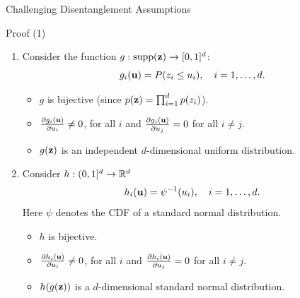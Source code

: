 \begin{frame}{Challenging Disentanglement Assumptions}
\begin{block}{Proof (1)}
	\begin{enumerate}
		\item 
		Consider the function $g: \text{supp}(\mathbf{z}) \rightarrow [0, 1]^d$:
		\vspace{-0.1cm}
		\[
		g_i(\mathbf{u}) = P(z_i \leq u_i), \quad i=1, \dots, d.
		\]
		\vspace{-0.4cm}
		\begin{itemize}
			\item $g$ is bijective (since $p(\mathbf{z}) = \prod_{i=1}^dp(z_i)$).
			\item $\frac{\partial g_i(\mathbf{u})}{\partial u_i} \neq 0$, for all $i$ and $\frac{\partial g_i(\mathbf{u})}{\partial u_j} = 0$ for all $i \neq j$.
			\item $g(\mathbf{z})$ is an independent $d$-dimensional uniform distribution.
		\end{itemize}
		\item 
		Consider $h: (0, 1]^d \rightarrow \mathbb{R}^d$
		\[
		h_i(\mathbf{u}) = \psi^{-1}(u_i), \quad i= 1, \dots, d.
		\]
		Here $\psi$  denotes the CDF of a standard normal distribution.
		\begin{itemize}
			\item $h$ is bijective.
			\item $\frac{\partial h_i(\mathbf{u})}{\partial u_i} \neq 0$, for all $i$ and $\frac{\partial h_i(\mathbf{u})}{\partial u_j} = 0$ for all $i \neq j$.
			\item $h(g(\mathbf{z}))$  is a $d$-dimensional standard normal distribution.
		\end{itemize}
	\end{enumerate}
\end{block}

\end{frame}
